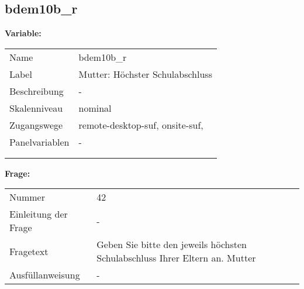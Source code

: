 	
	
	\subsection{bdem10b\_r}
	\label{subSection:bdem10b_r}

	\noindent\textbf{Variable:}\\
		\begin{tabular}{lL{11.3cm}}
			\label{tableVariable:bdem10b_r}
			Name & bdem10b\_r \\
			Label & Mutter: Höchster Schulabschluss \\
			Beschreibung & - \\
			Skalenniveau & nominal \\
			Zugangswege &
				remote-desktop-suf,
				onsite-suf,
 \\
			Panelvariablen & -
			 \\
			 \\
 \\
		\end{tabular}

		\vspace*{1 cm}
		\noindent\textbf{Frage:}\\
		\begin{tabular}{lL{11.3cm}}
			\label{tableQuestion:bdem10b_r}
			Nummer & 42 \\
			Einleitung der Frage & - \\
			Fragetext & Geben Sie bitte den jeweils höchsten Schulabschluss Ihrer Eltern an.
Mutter \\
			Ausfüllanweisung & - \\
		\end{tabular}





